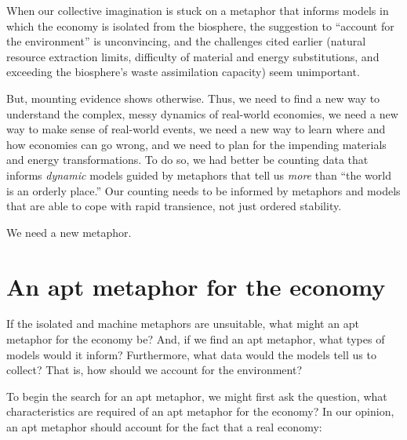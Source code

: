 When our collective imagination is stuck on a metaphor that 
informs models in which the economy is isolated from the biosphere,
the suggestion to ``account for the environment'' is unconvincing, and 
the challenges cited earlier (natural resource extraction limits,
difficulty of material and energy substitutions, and 
exceeding the biosphere's waste assimilation capacity)
seem unimportant. 

But, mounting evidence shows otherwise. 
Thus, we need to find a new way to understand the complex, 
messy dynamics of real-world economies,
we need a new way to make sense of real-world events, 
we need a new way to learn where and how economies can go wrong, and
we need to plan for the impending materials and energy transformations.
To do so, we had better be counting data that informs \emph{dynamic} models
guided by metaphors that tell us \emph{more} than ``the world is an orderly place.''
Our counting needs to be informed by metaphors and models that are
able to cope with rapid transience,
not just ordered stability.

We need a new metaphor.



\section{An apt metaphor for the economy}
\label{sec:apt_metaphor}

If the isolated and machine metaphors are unsuitable, 
what might an apt metaphor for the economy be?
And, if we find an apt metaphor, what types of models would it inform?
Furthermore, what data would the models tell us to collect?
That is, how should we account for the environment?

To begin the search for an apt metaphor, 
we might first ask the question, 
what characteristics are required of an apt metaphor for the economy?
In our opinion, an apt metaphor should account for the fact 
that a real economy:

